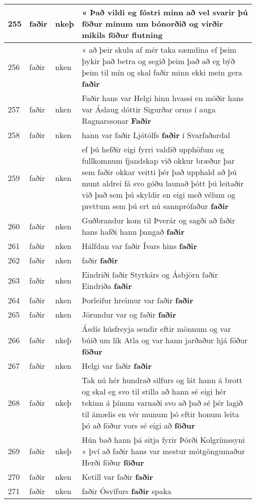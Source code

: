 \documentclass{article}
\begin{document}
\begin{longtable}{p{1cm}|p{1cm}|p{1cm}|p{13cm}}
\hline
255&faðir&nkeþ&« Það vildi eg fóstri minn að vel svarir þú föður mínum um bónorðið og virðir mikils \textbf{föður} flutning\\
\hline
256&faðir&nken&« að þeir skulu af mér taka sæmdina ef þeim þykir það betra og segið þeim það að eg býð þeim til mín og skal faðir minn ekki mein gera \textbf{faðir} \\
\hline
257&faðir&nken&Faðir hans var Helgi hinn hvassi en móðir hans var Áslaug dóttir Sigurðar orms í auga Ragnarssonar \textbf{Faðir} \\
\hline
258&faðir&nken&hann var faðir Ljótólfs \textbf{faðir} í Svarfaðardal\\
\hline
259&faðir&nken&ef þú hefðir eigi fyrri valdið upphöfum og fullkomnum fjandskap við okkur bræður þar sem faðir okkar veitti þér það upphald að þú munt aldrei fá svo góðu launað þótt þú leitaðir við það sem þú skyldir en eigi með vélum og prettum sem þú ert nú sannprófaður \textbf{faðir} \\
\hline
260&faðir&nken&Guðbrandur kom til Þverár og sagði að faðir hans hafði hann þangað \textbf{faðir} \\
\hline
261&faðir&nken&Hálfdan var faðir Ívars hins \textbf{faðir} \\
\hline
262&faðir&nken&faðir \textbf{faðir} \\
\hline
263&faðir&nken&Eindriði faðir Styrkárs og Ásbjörn faðir Eindriða \textbf{faðir} \\
\hline
264&faðir&nken&Þorleifur hreimur var faðir \textbf{faðir} \\
\hline
265&faðir&nken&Jörundur var og faðir \textbf{faðir} \\
\hline
266&faðir&nkeþ&Ásdís húsfreyja sendir eftir mönnum og var búið um lík Atla og var hann jarðaður hjá föður \textbf{föður} \\
\hline
267&faðir&nken&Helgi var faðir \textbf{faðir} \\
\hline
268&faðir&nkeþ&Tak nú hér hundrað silfurs og lát hann á brott og skal eg svo til stilla að hann sé eigi hér tekinn á þínum varnaði svo að það sé þér lagið til ámælis en vér munum þó eftir honum leita þó að föður vors sé eigi að \textbf{föður} \\
\hline
269&faðir&nkeþ&Hún bað hann þá sitja fyrir Þórði Kolgrímssyni « því að faðir hans var mestur mótgöngumaður Herði föður \textbf{föður} \\
\hline
270&faðir&nken&Ketill var faðir \textbf{faðir} \\
\hline
271&faðir&nken&faðir Ósvífurs \textbf{faðir} spaka\\

\end{longtable}
\end{document}
